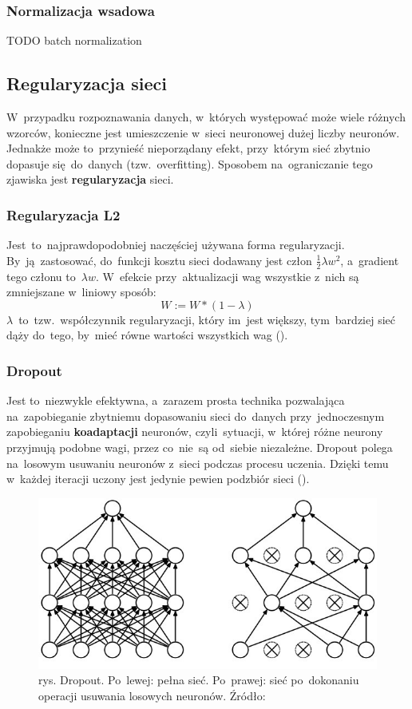 \subsubsection{Normalizacja wsadowa}
TODO batch normalization %

\subsection{Regularyzacja sieci}
W~przypadku rozpoznawania danych, w~których występować może wiele różnych wzorców, konieczne jest umieszczenie w~sieci
neuronowej dużej liczby neuronów. Jednakże może to~przynieść nieporządany efekt, przy~którym sieć zbytnio dopasuje
się~do~danych (tzw.~overfitting). Sposobem na~ograniczanie tego zjawiska jest \textbf{regularyzacja} sieci.

\subsubsection{Regularyzacja L2} \label{sssec:reg_L2}
Jest~to~najprawdopodobniej naczęściej używana forma regularyzacji. By~ją~zastosować, do~funkcji kosztu sieci dodawany
jest człon $\frac{1}{2}\lambda w^2$, a~gradient tego członu to~$\lambda w$. W~efekcie przy~aktualizacji wag wszystkie
z~nich są zmniejszane w~liniowy sposób:
\begin{equation*}
W := W*(1 -\lambda)
\end{equation*}
$\lambda$~to~tzw.~współczynnik regularyzacji, który im~jest większy, tym~bardziej sieć dąży do~tego,
by~mieć równe wartości wszystkich wag (\cite{L2-regularization}).

\subsubsection{Dropout}
Jest to~niezwykle efektywna, a~zarazem prosta technika pozwalająca na~zapobieganie zbytniemu dopasowaniu sieci
do~danych przy~jednoczesnym zapobieganiu \textbf{koadaptacji} neuronów, czyli~sytuacji, w~której różne neurony
przyjmują podobne wagi, przez co~nie~są od~siebie niezależne. Dropout polega na~losowym usuwaniu neuronów z~sieci
podczas procesu uczenia. Dzięki temu w~każdej iteracji uczony jest jedynie pewien podzbiór sieci (\cite{dropout}).

\begin{figure}[H]
	\centering
	\includegraphics[width=\linewidth]{img/dropout.jpeg}
	\caption{rys. Dropout. Po~lewej: pełna sieć. Po~prawej: sieć po~dokonaniu operacji usuwania losowych neuronów.
	         Źródło: \cite{dropout}}
\end{figure}

